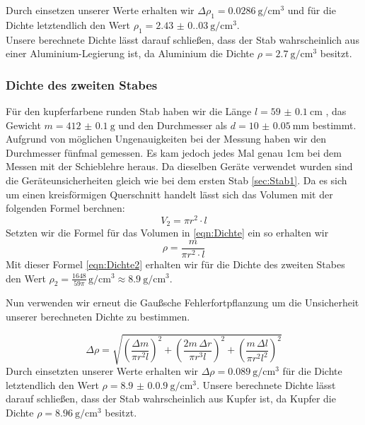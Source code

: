 Durch einsetzen unserer Werte erhalten wir $\Delta\rho_1 = \qty{0.0286}{\gram\per\centi\metre\cubed}$ und für die Dichte letztendlich den Wert $\rho_1 = \qty{2.43(0.03)}{\gram\per\centi\metre\cubed}$.\\
Unsere berechnete Dichte lässt darauf schließen, dass der Stab wahrscheinlich aus einer Aluminium-Legierung ist, da Aluminium die Dichte $ \rho = \qty{2.7}{\gram\per\centi\metre\cubed}$ besitzt.
\subsubsection{Dichte des zweiten Stabes}
Für den kupferfarbene runden Stab haben wir die Länge $l = \qty{59(0.1)}{\centi\meter}$ , das Gewicht $m = \qty{412(0.1)}{\gram}$ und den Durchmesser als $d = \qty{10(0.05)}{\milli\meter}$ bestimmt. Aufgrund von möglichen Ungenauigkeiten bei der Messung haben wir den Durchmesser fünfmal gemessen.
Es kam jedoch jedes Mal genau 1cm bei dem Messen mit der Schieblehre heraus. Da dieselben Geräte verwendet wurden sind die Geräteunsicherheiten gleich wie bei dem ersten Stab \ref{sec:Stab1}.
Da es sich um einen kreisförmigen Querschnitt handelt lässt sich das Volumen mit der folgenden Formel berchnen:
\begin{equation}
  V_2 = \pi r^2 \cdot l
\end{equation}
Setzten wir die Formel für das Volumen in \ref{eqn:Dichte} ein so erhalten wir
\begin{equation}
  \rho = \frac{m}{\pi r^2 \cdot l}
  \label{eqn:Dichte2}
\end{equation}
Mit dieser Formel \ref{eqn:Dichte2} erhalten wir für die Dichte des zweiten Stabes den Wert $ \rho_2 = \frac{1648}{59\pi}\,\si{\gram\per\centi\metre\cubed} \approx \qty{8.9}{\gram\per\centi\metre\cubed} $.

Nun verwenden wir erneut die Gaußsche Fehlerfortpflanzung um die Unsicherheit unserer berechneten Dichte zu bestimmen.

\begin{equation}
  \Delta\rho = \sqrt{
    \left( \frac{\Delta m}{\pi r^2 l} \right)^2 +
    \left( \frac{2m \, \Delta r}{\pi r^3 l} \right)^2 +
    \left( \frac{m \, \Delta l}{\pi r^2 l^2} \right)^2
  }
\end{equation}
Durch einsetzten unserer Werte erhalten wir $\Delta\rho = \qty{0.089}{\gram\per\centi\metre\cubed}$ für die Dichte letztendlich den Wert $\rho = \qty{8.9(0.09)}{\gram\per\centi\metre\cubed}$.
Unsere berechnete Dichte lässt darauf schließen, dass der Stab wahrscheinlich aus Kupfer ist, da Kupfer die Dichte $ \rho = \qty{8.96}{\gram\per\centi\metre\cubed}$ besitzt.

